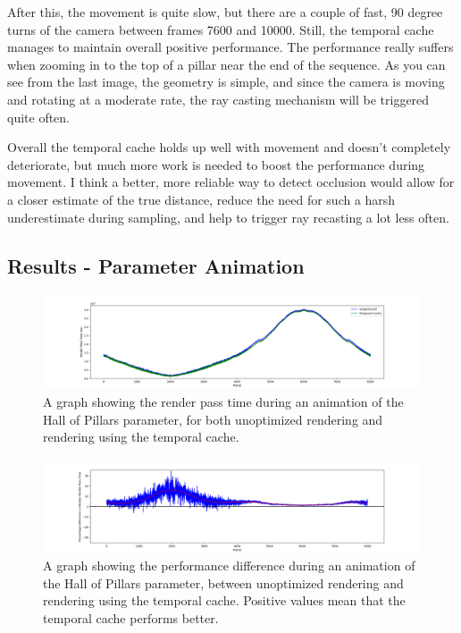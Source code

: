 After this, the movement is quite slow, but there are a couple of fast, 90 degree turns of the camera between frames 7600 and 10000. Still, the temporal cache manages to maintain overall positive performance. The performance really suffers when zooming in to the top of a pillar near the end of the sequence. As you can see from the last image, the geometry is simple, and since the camera is moving and rotating at a moderate rate, the ray casting mechanism will be triggered quite often.\newline

Overall the temporal cache holds up well with movement and doesn't completely deteriorate, but much more work is needed to boost the performance during movement. I think a better, more reliable way to detect occlusion would allow for a closer estimate of the true distance, reduce the need for such a harsh underestimate during sampling, and help to trigger ray recasting a lot less often.

\subsection{Results - Parameter Animation}

\begin{figure}[ht]
	\centering
	\includegraphics[width=\linewidth, frame]{Images/Results/Hall-Of-Pillars-Parameter-Animation.png}
	\caption{A graph showing the render pass time during an animation of the Hall of Pillars parameter, for both unoptimized rendering and rendering using the temporal cache.}
	\label{figure:hall-of-pillars-parameter-animation}
\end{figure}

\begin{figure}[ht]
	\centering
	\includegraphics[width=\linewidth, frame]{Images/Results/Hall-Of-Pillars-Parameter-Animation-Gain.png}
	\caption{A graph showing the performance difference during an animation of the Hall of Pillars parameter, between unoptimized rendering and rendering using the temporal cache. Positive values mean that the temporal cache performs better.}
	\label{figure:hall-of-pillars-parameter-animation-gain}
\end{figure}

